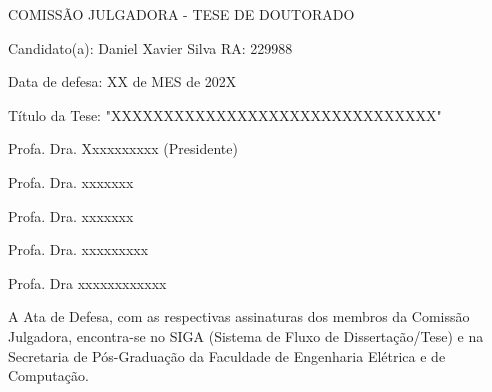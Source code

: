 \documentclass[
    12pt,                %
    oneside,            %
    a4paper,            %
    english,            %
    french,                %
    spanish,            %
    brazil                %
    ]{abntex2}
\begin{document}
    
    
    


% 
%

%
% 
%
\begin{folhadeaprovacao}

  \begin{center}
    COMISS\~{A}O JULGADORA - TESE DE DOUTORADO
\end{center}
\noindent
\begin{minipage}{\textwidth}\SingleSpacing
Candidato(a): Daniel Xavier Silva     RA: 229988

Data de defesa: XX de MES de 202X

T\'{i}tulo da Tese: "XXXXXXXXXXXXXXXXXXXXXXXXXXXXXXX"
\vspace{2cm}

Profa. Dra. Xxxxxxxxxx (Presidente)

Profa. Dra. xxxxxxx

Profa. Dra. xxxxxxx

Profa. Dra. xxxxxxxxx

Profa. Dra xxxxxxxxxxxx

\vspace{2cm}

A Ata de Defesa, com as respectivas assinaturas dos membros da Comissão Julgadora, encontra-se no SIGA (Sistema de Fluxo de Dissertação/Tese) e na Secretaria de Pós-Graduação da Faculdade de Engenharia Elétrica e de Computação.
\end{minipage}

\end{folhadeaprovacao}
\end{document}
